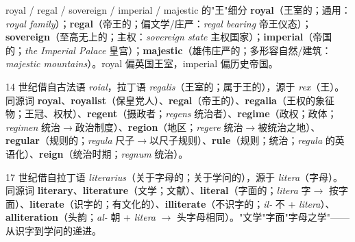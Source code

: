 \documentclass[../main.tex]{subfiles}
\begin{document}


\begin{gram}{royal / regal / sovereign / imperial / majestic 的"王"细分}
\textbf{royal}（王室的；通用：\textit{royal family}）；\textbf{regal}（帝王的；偏文学/庄严：\textit{regal bearing} 帝王仪态）；\textbf{sovereign}（至高无上的；主权：\textit{sovereign state} 主权国家）；\textbf{imperial}（帝国的；\textit{the Imperial Palace} 皇宫）；\textbf{majestic}（雄伟庄严的；多形容自然/建筑：\textit{majestic mountains}）。royal 偏英国王室，imperial 偏历史帝国。
\end{gram}

\begin{origin}
14 世纪借自古法语 \textit{roial}，拉丁语 \textit{regalis}（王室的；属于王的），源于 \textit{rex}（王）。同源词 \textbf{royal}、\textbf{royalist}（保皇党人）、\textbf{regal}（帝王的）、\textbf{regalia}（王权的象征物；王冠、权杖）、\textbf{regent}（摄政者；\textit{regens} 统治者）、\textbf{regime}（政权；政体；\textit{regimen} 统治$\to$政治制度）、\textbf{region}（地区；\textit{regere} 统治$\to$被统治之地）、\textbf{regular}（规则的；\textit{regula} 尺子$\to$以尺子规则）、\textbf{rule}（规则；统治；\textit{regula} 的英语化）、\textbf{reign}（统治时期；\textit{regnum} 统治）。
\end{origin}




\begin{origin}
17 世纪借自拉丁语 \textit{literarius}（关于字母的；关于学问的），源于 \textit{litera}（字母）。同源词 \textbf{literary}、\textbf{literature}（文学；文献）、\textbf{literal}（字面的；\textit{litera} 字$\to$ 按字面）、\textbf{literate}（识字的；有文化的）、\textbf{illiterate}（不识字的；\textit{il-} 不 + \textit{litera}）、\textbf{alliteration}（头韵；\textit{al-} 朝 + \textit{litera} $\to$ 头字母相同）。"文学"字面"字母之学"——从识字到学问的递进。
\end{origin}
\end{document}
